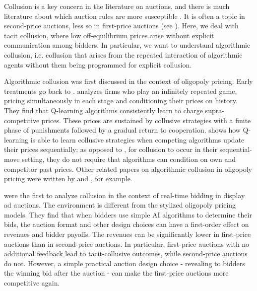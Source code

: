 \documentclass{article}
\begin{document}
Collusion is a key concern in the literature on auctions, and there is much literature about which auction rules are more susceptible \citep{skrzypacz2004tacit, fabra2003tacit,blume2008modeling}. 
It is often a topic in second-price auctions, less so in first-price auctions (see \citet{krishna2009auction}). 
Here, we deal with tacit collusion, where low off-equilibrium prices arise without explicit communication among bidders. In particular, we want to understand algorithmic collusion, i.e. collusion that arises from the repeated interaction of algorithmic agents without them being programmed for explicit collusion. 

Algorithmic collusion was first discussed in the context of oligopoly pricing. Early treatments go back to \citet{greenwald2000shopbots}. \citet{Calvano.2020} analyzes firms who play an infinitely repeated game, pricing simultaneously in each stage and conditioning their prices on history. They find that Q-learning algorithms consistently learn to charge supra-competitive prices. These prices are sustained by collusive strategies with a finite phase of punishments followed by a gradual return to cooperation. \citet{Klein.2021} shows how Q-learning is able to learn collusive strategies when competing algorithms update their prices sequentially; as opposed to \citet{Calvano.2020}, for collusion to occur in their sequential-move setting, they do not require that algorithms can condition on own and competitor past prices. Other related papers on algorithmic collusion in oligopoly pricing were written by \citet{Hettich.2021} and \citet{Asker.2022}, for example. 

\citet{banchio2022artificial} were the first to analyze collusion in the context of real-time bidding in display ad auctions. The environment is different from the stylized oligopoly pricing models. They find that when bidders use simple AI algorithms to determine their bids, the auction format and other design choices can have a first-order effect on revenues and bidder payoffs. The revenues can be significantly lower in first-price auctions than in second-price auctions. In particular, first-price auctions with no additional feedback lead to tacit-collusive outcomes, while second-price auctions do not. However, a simple practical auction design choice - revealing to bidders the winning bid after the auction - can make the first-price auctions more competitive again.
\end{document}
